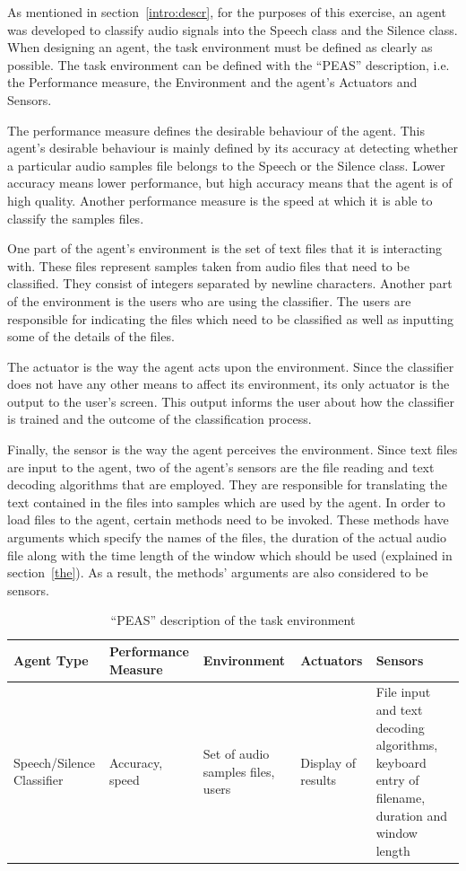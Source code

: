 \documentclass{article}
\begin{document}
As mentioned in section~\ref{intro:descr}, for the purposes of this exercise, an agent was developed to classify audio signals into the Speech class and the Silence class.
When designing an agent, the task environment must be defined as clearly as possible.
The task environment can be defined with the ``PEAS'' description, i.e. the Performance measure, the Environment and the agent's Actuators and Sensors.

The performance measure defines the desirable behaviour of the agent.
This agent's desirable behaviour is mainly defined by its accuracy at detecting whether a particular audio samples file belongs to the Speech or the Silence class.
Lower accuracy means lower performance, but high accuracy means that the agent is of high quality.
Another performance measure is the speed at which it is able to classify the samples files.

One part of the agent's environment is the set of text files that it is interacting with. 
These files represent samples taken from audio files that need to be classified. 
They consist of integers separated by newline characters. 
Another part of the environment is the users who are using the classifier. 
The users are responsible for indicating the files which need to be classified as well as inputting some of the details of the files.

The actuator is the way the agent acts upon the environment.
Since the classifier does not have any other means to affect its environment, its only actuator is the output to the user's screen.
This output informs the user about how the classifier is trained and the outcome of the classification process. %

Finally, the sensor is the way the agent perceives the environment.
Since text files are input to the agent, two of the agent's sensors are the file reading and text decoding algorithms that are employed.
They are responsible for translating the text contained in the files into samples which are used by the agent.
In order to load files to the agent, certain methods need to be invoked. 
These methods have arguments which specify the names of the files, the duration of the actual audio file along with the time length of the window which should be used (explained in section~\ref{the}). 
As a result, the methods' arguments are also considered to be sensors.

\begin{table}[!h]

  \centering
  \begin{tabular}{ | p{} || p{} | p{} | p{} | p{} | }
    \hline
    Agent Type & Performance Measure & Environment & Actuators & Sensors \\
    \hline
    Speech/Silence Classifier & 
    Accuracy, speed & 
    Set of audio samples files, users & 
    Display of results & 
    File input and text decoding algorithms, keyboard entry of filename, duration and window length \\
    \hline
  \end{tabular}
  \caption{``PEAS'' description of the task environment}
  \label{tab:peas}
\end{table}
\end{document}
